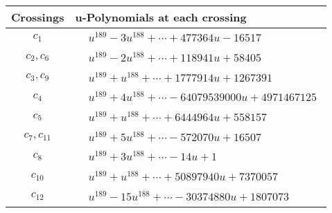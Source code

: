 \documentclass[1p]{elsarticle_modified}
\theoremstyle{definition}
\begin{document}
\begin{tabular}{m{50pt}|m{274pt}}
Crossings & \hspace{64pt}u-Polynomials at each crossing \\
\hline $$\begin{aligned}c_{1}\end{aligned}$$&$\begin{aligned}
&u^{189}-3 u^{188}+\cdots+477364 u-16517
\end{aligned}$\\
\hline $$\begin{aligned}c_{2},c_{6}\end{aligned}$$&$\begin{aligned}
&u^{189}-2 u^{188}+\cdots+118941 u+58405
\end{aligned}$\\
\hline $$\begin{aligned}c_{3},c_{9}\end{aligned}$$&$\begin{aligned}
&u^{189}+u^{188}+\cdots+1777914 u+1267391
\end{aligned}$\\
\hline $$\begin{aligned}c_{4}\end{aligned}$$&$\begin{aligned}
&u^{189}+4 u^{188}+\cdots-64079539000 u+4971467125
\end{aligned}$\\
\hline $$\begin{aligned}c_{5}\end{aligned}$$&$\begin{aligned}
&u^{189}+u^{188}+\cdots+6444964 u+558157
\end{aligned}$\\
\hline $$\begin{aligned}c_{7},c_{11}\end{aligned}$$&$\begin{aligned}
&u^{189}+5 u^{188}+\cdots-572070 u+16507
\end{aligned}$\\
\hline $$\begin{aligned}c_{8}\end{aligned}$$&$\begin{aligned}
&u^{189}+3 u^{188}+\cdots-14 u+1
\end{aligned}$\\
\hline $$\begin{aligned}c_{10}\end{aligned}$$&$\begin{aligned}
&u^{189}+u^{188}+\cdots+50897940 u+7370057
\end{aligned}$\\
\hline $$\begin{aligned}c_{12}\end{aligned}$$&$\begin{aligned}
&u^{189}-15 u^{188}+\cdots-30374880 u+1807073
\end{aligned}$\\
\hline
\end{tabular}\\~\\
\end{document}
